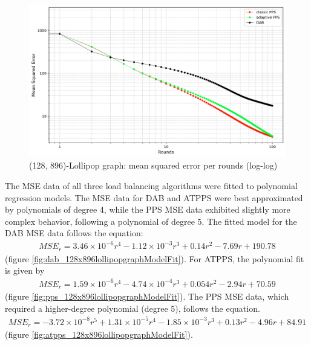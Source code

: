 \begin{figure}[]
    \centering
    \includegraphics[width=\linewidth]{figures/Simulation_outcomes/LollipopGraph/128_896/DAB_vs_PPS_LG_r100_n1024_averaged_loglog.png}
    \caption{(128, 896)-Lollipop graph: mean squared error per rounds (log-log)}
    \label{fig:128_896lollipopgraphMSEperRoundLogLog}
\end{figure}

The MSE data of all three load balancing algorithms were fitted to polynomial regression models. The MSE data for DAB and ATPPS were best approximated by polynomials of degree 4, while the PPS MSE data exhibited slightly more complex behavior, following a polynomial of degree 5. The fitted model for the DAB MSE data follows the equation: 
\begin{align}
    MSE_r=3.46\times 10^{-6}r^{4}-1.12\times 10^{-3}r^{3}+0.14r^{2}-7.69r+190.78    
\end{align}
(figure \ref{fig:dab_128x896lollipopgraphModelFit}). For ATPPS, the polynomial fit is given by 
\begin{align}
    MSE_r=1.59\times 10^{-6}r^{4}-4.74\times 10^{-4}r^{3}+0.054r^{2}-2.94r+70.59    
\end{align}
(figure \ref{fig:pps_128x896lollipopgraphModelFit}). The PPS MSE data, which required a higher-degree polynomial (degree 5), follows the equation. 
\begin{align}
    MSE_r=-3.72\times10^{-8}r^{5}+1.31\times 10^{-5}r^{4}-1.85\times 10^{-3}r^{3}+0.13r^{2}-4.96r+84.91    
\end{align}
(figure \ref{fig:atpps_128x896lollipopgraphModelFit}).


